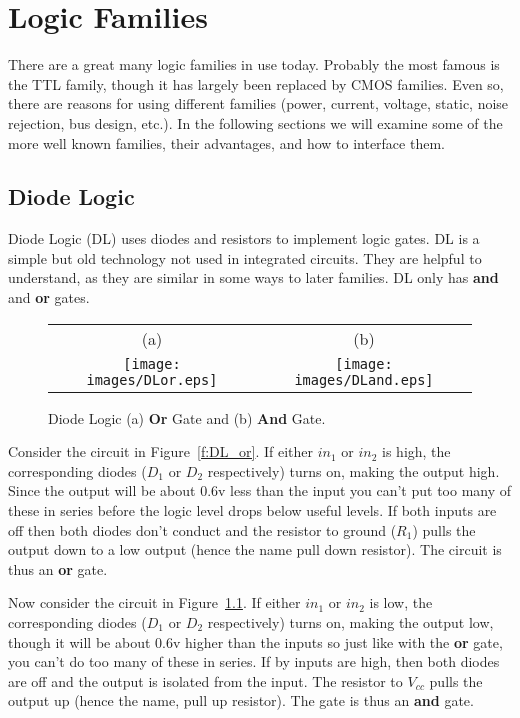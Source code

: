 \chapter{Logic Families}

There are a great many logic families in use today.  Probably the most famous is the TTL family, though it has largely been replaced by CMOS families.  Even so, there are reasons for using different families (power, current, voltage, static, noise rejection, bus design, etc.).  In the following sections we will examine some of the more well known families, their advantages, and how to interface them.


\section{Diode Logic}
Diode Logic (DL) uses diodes and resistors to implement logic gates.  DL is a simple but old technology not used in integrated circuits.  They are helpful to understand, as they are similar in some ways to later families.  DL only has \textbf{and} and \textbf{or} gates.

\begin{figure}
\begin{center}
\caption{Diode Logic  (a) \textbf{Or} Gate\label{f:DL_or} and (b) \textbf{And} Gate.}\label{f:DL_and}
\begin{tabular}{cc}
(a) & (b) \\
\texttt{[image: images/DLor.eps]}&\texttt{[image: images/DLand.eps]}\\
\end{tabular}
\end{center}
\end{figure}
Consider the circuit in Figure~\ref{f:DL_or}.  If either $in_1$ or $in_2$ is high, the corresponding diodes ($D_1$ or $D_2$ respectively) turns on, making the output high.  Since the output will be about 0.6v less than the input you can't put too many of these in series before the logic level drops below useful levels.  If both inputs are off then both diodes don't conduct and the resistor to ground ($R_1$) pulls the output down to a low output (hence the name pull down resistor).  The circuit is thus an \textbf{or} gate.

Now consider the circuit in Figure~\ref{f:DL_and}.  If either $in_1$ or $in_2$ is low, the corresponding diodes ($D_1$ or $D_2$ respectively) turns on, making the output low, though it will be about 0.6v higher than the inputs so just like with the \textbf{or} gate, you can't do too many of these in series.  If by inputs are high, then both diodes are off and the output is isolated from the input.  The resistor to $V_{cc}$ pulls the output up (hence the name, pull up resistor).  The gate is thus an \textbf{and} gate.


